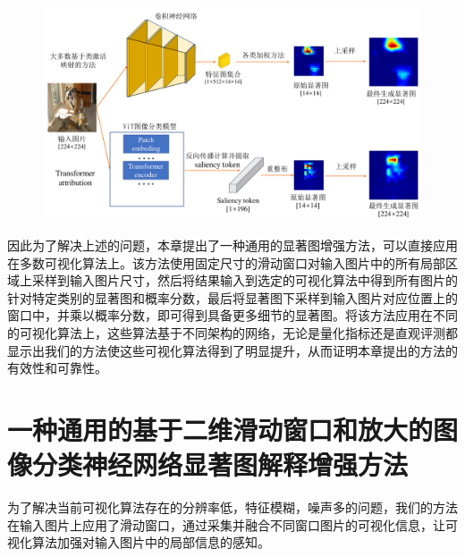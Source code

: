 \begin{figure}[h]
	\centering 
	\includegraphics[width=15cm]{fig/ch4/motivation.pdf}
	\label{fig:motivation}
\end{figure}


因此为了解决上述的问题，本章提出了一种通用的显著图增强方法，可以直接应用在多数可视化算法上。该方法使用固定尺寸的滑动窗口对输入图片中的所有局部区域上采样到输入图片尺寸，然后将结果输入到选定的可视化算法中得到所有图片的针对特定类别的显著图和概率分数，最后将显著图下采样到输入图片对应位置上的窗口中，并乘以概率分数，即可得到具备更多细节的显著图。将该方法应用在不同的可视化算法上，这些算法基于不同架构的网络，无论是量化指标还是直观评测都显示出我们的方法使这些可视化算法得到了明显提升，从而证明本章提出的方法的有效性和可靠性。


\section{一种通用的基于二维滑动窗口和放大的图像分类神经网络显著图解释增强方法}
为了解决当前可视化算法存在的分辨率低，特征模糊，噪声多的问题，我们的方法在输入图片上应用了滑动窗口，通过采集并融合不同窗口图片的可视化信息，让可视化算法加强对输入图片中的局部信息的感知。


